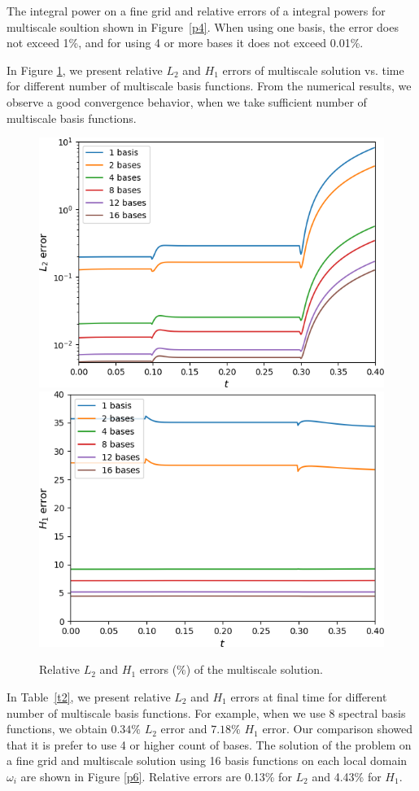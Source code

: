 \documentclass[runningheads]{llncs}
\begin{document}
The integral power on a fine grid and relative errors of a integral powers for multiscale soultion shown in Figure~\ref{p4}. 
When using one basis, the error does not exceed 1\%, and for using 4 or more bases it does not exceed 0.01\%.

In Figure \ref{p5}, we present relative $L_2$ and $H_1$ errors of multiscale solution vs. time for different number of multiscale basis functions.
From the numerical results, we observe a good convergence behavior, when we take sufficient number of multiscale basis functions.

\begin{figure}[h!]
\centering
\includegraphics[width=0.45\linewidth]{L2_log.png} 
\hspace{2em}
\includegraphics[width=0.45\linewidth]{H1.png} 
\caption{Relative $L_2$ and $H_1$ errors ($\%$) of the multiscale solution.}
\label{p5}
\end{figure} 

In Table~\ref{t2}, we present relative $L_2$ and $H_1$ errors at final time for different number of multiscale basis functions.
For example, when we use 8 spectral basis functions, we obtain $0.34\%$ $L_2$ error and $7.18\%$ $H_1$ error. 
Our comparison showed that it is prefer to use 4 or higher count of bases. 
The solution of the problem on a fine grid and multiscale solution using 16 basis functions on each local domain $\omega_i$ are shown in Figure \ref{p6}. Relative errors are 0.13\% for $L_2$ and 4.43\% for $H_1$. 
\end{document}
